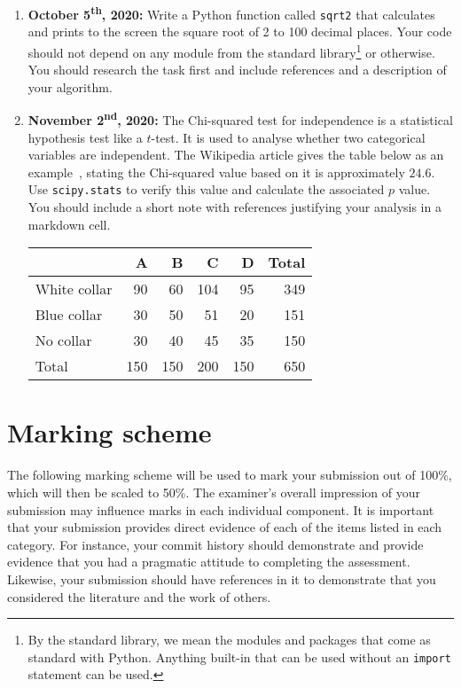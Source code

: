 \documentclass[a4paper, 12pt]{scrartcl}
\begin{document}
    \begin{enumerate}
      \item
        \textbf{October 5\textsuperscript{th}, 2020:}
        Write a Python function called \texttt{sqrt2} that calculates and prints to the screen the square root of 2 to 100 decimal places.
        Your code should not depend on any module from the standard library\footnote{By the standard library, we mean the modules and packages that come as standard with Python. Anything built-in that can be used without an \texttt{import} statement can be used.} or otherwise.
        You should research the task first and include references and a description of your algorithm.
      \item
        \textbf{November 2\textsuperscript{nd}, 2020:}
        The Chi-squared test for independence is a statistical hypothesis test like a $t$-test. It is used to analyse whether two categorical variables are independent. The Wikipedia article gives the table below as an example~\cite{wikichisquare}, stating the Chi-squared value based on it is approximately $24.6$. Use \texttt{scipy.stats} to verify this value and calculate the associated $p$ value. You should include a short note with references justifying your analysis in a markdown cell.
        
        \begin{table}[H]
          \setlength{\tabcolsep}{12pt}
          \renewcommand{\arraystretch}{1.1}
          \centering
          \begin{tabular}{lrrrrr}
            & A & B & C& D & Total \\
            \midrule
            White collar & 90 & 60 & 104 & 95 & 349 \\
            Blue collar & 30 & 50 & 51 & 20 & 151 \\
            No collar & 30 & 40 & 45 & 35 & 150 \\
            \midrule
            Total & 150 & 150 & 200 & 150 & 650
          \end{tabular}
        \end{table}

    \end{enumerate}

  \newpage

  \section*{Marking scheme}
    The following marking scheme will be used to mark your submission out of 100\%, which will then be scaled to 50\%.
    The examiner's overall impression of your submission may influence marks in each individual component.
    It is important that your submission provides direct evidence of each of the items listed in each category.
    For instance, your commit history should demonstrate and provide evidence that you had a pragmatic attitude to completing the assessment.
    Likewise, your submission should have references in it to demonstrate that you considered the literature and the work of others.
  
\end{document}

